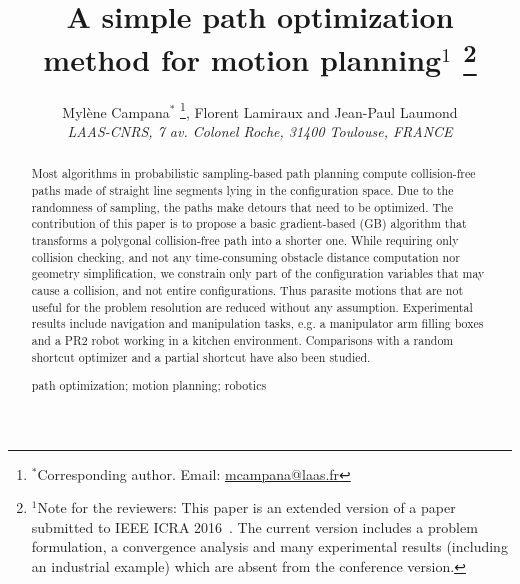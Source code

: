 \documentclass{tADR2e}
\begin{document}
\graphicspath{{images/}}



\title{A simple path optimization method for motion planning$^{1}$ \thanks{$^{1}$Note for the reviewers: 
This paper is an extended version of a paper submitted to IEEE ICRA 2016~\cite{pathOptimICRA_HAL}. The 
current version includes a problem formulation, a convergence analysis and many experimental results (including an 
industrial example) which are absent from the conference version.}}	

\author{Myl\`{e}ne Campana$^{\ast}$ \thanks{$^\ast$Corresponding author. Email: \href{mailto:mcampana@laas.fr}{mcampana@laas.fr}}, Florent Lamiraux and Jean-Paul Laumond
\\\vspace{6pt}
{\em{LAAS-CNRS, 7 av. Colonel Roche, 31400 Toulouse, FRANCE}}
}
\maketitle



\begin{abstract}
Most algorithms in probabilistic sampling-based path planning compute 
collision-free paths made of straight line segments lying in the configuration 
space. Due
to the randomness of sampling, the paths make detours that need to be optimized.
The contribution of this paper is to propose a basic gradient-based (GB) algorithm 
that transforms a polygonal collision-free path into a shorter one.
While requiring only collision 
checking, and not any time-consuming obstacle distance computation nor geometry 
simplification, we constrain only part of the configuration variables 
that may cause a collision, and not entire configurations. Thus parasite motions that 
are not useful for the problem resolution are reduced without any 
assumption.
Experimental results include navigation and manipulation tasks, 
e.g. a manipulator arm filling boxes and a PR2 robot working in a kitchen 
environment. Comparisons with a random shortcut optimizer and a partial 
shortcut have also been studied.


\medskip

\begin{keywords}path optimization; motion planning; robotics
\end{keywords}\medskip

\end{abstract}
\end{document}
